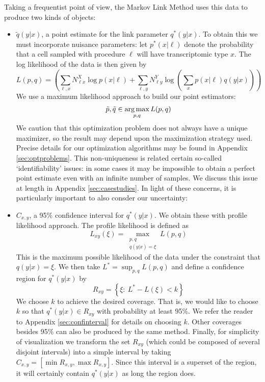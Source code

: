 Taking a frequentist point of view, the Markov Link Method uses this data to produce two kinds of objects:
\begin{itemize}
    \item $\tilde q(y|x)$, a point estimate for the link parameter $q^*(y|x)$.  To obtain this we must incorporate nuisance parameters: let $p^*(x|\ell)$ denote the probability that a cell sampled with procedure $\ell$ will have transcriptomic type $x$.  The log likelihood of the data is then given by
    \[
    L(p,q)=\left(\sum_{\ell,x} N^X_{\ell x} \log p(x|\ell) + \sum_{\ell,y} N^Y_{\ell y} \log \left(\sum_x p(x|\ell) q(y|x)\right)\right)
    \]
    We use a maximum likelihood approach to build our point estimators:
    \[
    \tilde p,\tilde q \in \operatorname*{arg\,max}_{p,q} L(p,q)
    \]
    We caution that this optimization problem does not always have a unique maximizer, so the result may depend upon the maximization strategy used.  Precise details for our optimization algorithms may be found in Appendix \ref{sec:optproblems}.  This non-uniqueness is related certain so-called `identifiability' issues: in some cases it may be impossible to obtain a perfect point estimate even with an infinite number of samples.   We discuss this issue at length in Appendix \ref{sec:casestudies}.  In light of these concerns, it is particularly important to also consder our uncertainty:
    \item $C_{x,y}$, a 95\% confidence interval for $q^*(y|x)$.  We obtain these with profile likelihood approach.  The profile likelihood is defined as
    \[
    L_{x y}(\xi)=\max_{\substack{p,q \\ q(y|x)=\xi}} L(p,q)
    \]
    This is the maximum possible likelihood of the data under the constraint that $q(y| x)=\xi$.  We then take $L^* = \sup_{p,q} L(p,q)$ and define a confidence region for $q^*( y| x)$ by
    \[
    R_{x y} = \left\{\xi:\ L^* - L(\xi) < k\right\}
    \]
    We choose $k$ to achieve the desired coverage.  That is, we would like to choose $k$ so that $q^*(y|x) \in R_{x y}$ with probability at least 95\%.  We refer the reader to Appendix \ref{sec:confinterval} for details on choosing $k$.  Other coverages besides 95\% can also be produced by the same method.  Finally, for simplicity of visualization we transform the set $R_{x y}$ (which could be composed of several disjoint intervals) into a simple interval by taking $C_{x,y} = [\min R_{x,y},\max R_{x,y}]$.  Since this interval is a superset of the region, it will certainly contain $q^*(y|x)$ as long the region does.
\end{itemize}
    

